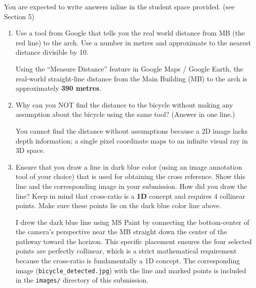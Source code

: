 You are expected to write answers inline in the student space provided.
(see Section 5)

\begin{enumerate}
\item Use a tool from Google that tells you the real world distance from MB (the red line) to the arch.
Use a number in metres and approximate to the nearest distance divisible by 10. 
\begin{studentSpace}
Using the ``Measure Distance'' feature in Google Maps / Google Earth, the real-world straight-line distance from the Main Building (MB) to the arch is approximately \textbf{390 metres}.
\end{studentSpace}

\item Why can you NOT find the distance to the bicycle without making any assumption about the bicycle using the same tool?
(Answer in one line.)
\begin{studentSpace}
You cannot find the distance without assumptions because a 2D image lacks depth information; a single pixel coordinate maps to an infinite visual ray in 3D space.
\end{studentSpace}

\item Ensure that you draw a line in dark blue color (using an image annotation tool of your choice) that is used for obtaining the cross reference.
Show this line and the corresponding image in your submission. How did you draw the line?
Keep in mind that cross-ratio is a \textbf{1D} concept and requires 4 collinear points.
Make sure these points lie on the dark blue color line above.
\begin{studentSpace}
I drew the dark blue line using MS Paint by connecting the bottom-center of the camera's perspective near the MB straight down the center of the pathway toward the horizon. This specific placement ensures the four selected points are perfectly collinear, which is a strict mathematical requirement because the cross-ratio is fundamentally a 1D concept. The corresponding image (\texttt{bicycle\_detected.jpg}) with the line and marked points is included in the \texttt{images/} directory of this submission.
\end{studentSpace}


\end{enumerate}
